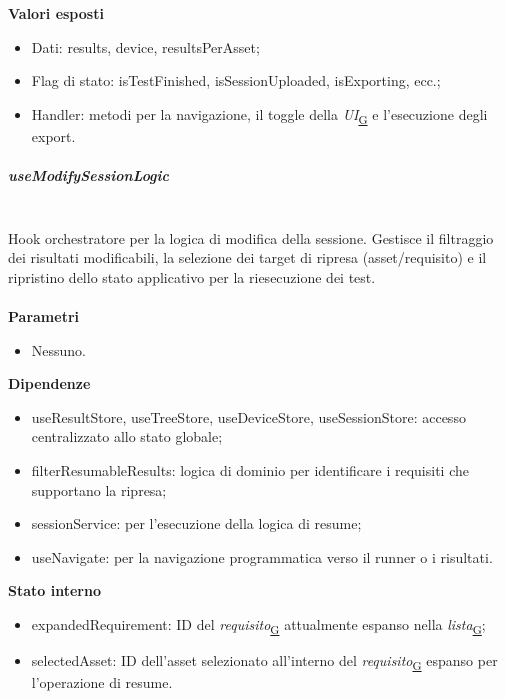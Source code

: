 \documentclass[a4paper,12pt]{article}
\begin{document}
                \textbf{Valori esposti}
                \begin{itemize}
                    \item Dati: {\ttfamily results}, {\ttfamily device}, {\ttfamily resultsPerAsset};
                    \item Flag di stato: {\ttfamily isTestFinished}, {\ttfamily isSessionUploaded}, {\ttfamily isExporting}, ecc.;
                    \item Handler: metodi per la navigazione, il toggle della \textit{UI}\textsubscript{\href{https://atlasteam9.github.io/Atlas/glossario.html\#UI}{G}} e l'esecuzione degli export.
                \end{itemize}
                
                \subparagraph{useModifySessionLogic}\mbox{}\\
                Hook orchestratore per la logica di modifica della sessione. Gestisce il filtraggio dei risultati modificabili, la selezione dei target di ripresa (asset/requisito) e il ripristino dello stato applicativo per la riesecuzione dei test.\\\\
                \textbf{Parametri}
                \begin{itemize}
                    \item Nessuno.
                \end{itemize}
                \textbf{Dipendenze}
                \begin{itemize}
                    \item {\ttfamily useResultStore}, {\ttfamily useTreeStore}, {\ttfamily useDeviceStore}, {\ttfamily useSessionStore}: accesso centralizzato allo stato globale;
                    \item {\ttfamily filterResumableResults}: logica di dominio per identificare i requisiti che supportano la ripresa;
                    \item {\ttfamily sessionService}: per l'esecuzione della logica di {\ttfamily resume};
                    \item {\ttfamily useNavigate}: per la navigazione programmatica verso il runner o i risultati.
                \end{itemize}
                \textbf{Stato interno}
                \begin{itemize}
                    \item {\ttfamily expandedRequirement}: ID del \textit{requisito}\textsubscript{\href{https://atlasteam9.github.io/Atlas/glossario.html\#Requisito}{G}} attualmente espanso nella \textit{lista}\textsubscript{\href{https://atlasteam9.github.io/Atlas/glossario.html\#Lista}{G}};
                    \item {\ttfamily selectedAsset}: ID dell'asset selezionato all'interno del \textit{requisito}\textsubscript{\href{https://atlasteam9.github.io/Atlas/glossario.html\#Requisito}{G}} espanso per l'operazione di {\ttfamily resume}.
                \end{itemize}
\end{document}
